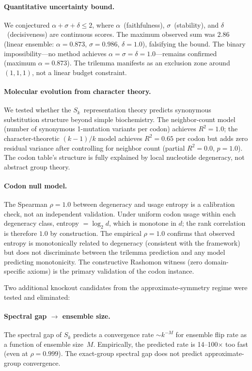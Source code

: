 \documentclass[11pt,a4paper]{article}
\begin{document}
\paragraph{Quantitative uncertainty bound.}
We conjectured $\alpha + \sigma + \delta \leq 2$, where $\alpha$~(faithfulness),
$\sigma$~(stability), and $\delta$~(decisiveness) are continuous scores.
The maximum observed sum was $2.86$ (linear ensemble: $\alpha = 0.873$,
$\sigma = 0.986$, $\delta = 1.0$), falsifying the bound.  The binary
impossibility---no method achieves $\alpha = \sigma = \delta = 1.0$---remains
confirmed (maximum $\alpha = 0.873$).  The trilemma manifests as an exclusion
zone around $(1, 1, 1)$, not a linear budget constraint.

\paragraph{Molecular evolution from character theory.}
We tested whether the $S_k$~representation theory predicts synonymous
substitution structure beyond simple biochemistry.  The neighbor-count model
(number of synonymous 1-mutation variants per codon) achieves $R^2 = 1.0$; the
character-theoretic $(k{-}1)/k$ model achieves $R^2 = 0.65$ per codon but adds
zero residual variance after controlling for neighbor count (partial $R^2 = 0.0$,
$p = 1.0$).  The codon table's structure is fully explained by local
nucleotide degeneracy, not abstract group theory.

\paragraph{Codon null model.}
The Spearman $\rho = 1.0$ between degeneracy and usage entropy is a calibration check, not an independent validation. Under uniform codon usage within each degeneracy class, entropy $= \log_2 d$, which is monotone in $d$; the rank correlation is therefore $1.0$ by construction. The empirical $\rho = 1.0$ confirms that observed entropy is monotonically related to degeneracy (consistent with the framework) but does not discriminate between the trilemma prediction and any model predicting monotonicity. The constructive Rashomon witness (zero domain-specific axioms) is the primary validation of the codon instance.

Two additional knockout candidates from the approximate-symmetry regime were
tested and eliminated:

\paragraph{Spectral gap $\to$ ensemble size.}
The spectral gap of $S_k$ predicts a convergence rate $\sim k^{-M}$ for
ensemble flip rate as a function of ensemble size~$M$.  Empirically, the
predicted rate is 14--100$\times$ too fast (even at $\rho = 0.999$).  The
exact-group spectral gap does not predict approximate-group convergence.
\end{document}
